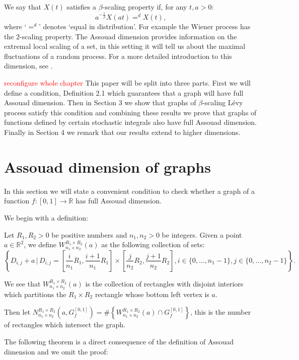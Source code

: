 We say that $X(t)$ satisfies a $\beta$-scaling property if, for any $t,a>0$:
\[
a^{-\frac{1}{\beta}}X(at)=^d X(t),
\]
where `$=^d$' denotes `equal in distribution'.
For example the Wiener process has the $2$-scaling property.
The Assouad dimension provides information on the extremal local scaling of a set, in this setting it will tell us about the maximal fluctuations of a random process. For a more detailed introduction to this dimension, see \cite{Fr, Ro}. 

\textcolor{red}{reconfigure whole chapter} This paper will be split into three parts. First we will define a condition, Definition 2.1 which guarantees that a graph will have full Assouad dimension. Then in Section 3 we show that graphs of $\beta$-scaling L\'evy process satisfy this condition and combining these results we prove that graphs of functions defined by certain stochastic integrals also have full Assouad dimension. Finally in Section 4 we remark that our results extend to higher dimensions.

\section{Assouad dimension of graphs}
In this section we will state a convenient condition to check whether a graph of a function $f:[0,1]\to\mathbb{R}$ has full Assouad dimension.

We begin with a definition:

\begin{definition}\label{Win}
	Let $R_1,R_2>0$ be positive numbers and $n_1,n_2>0$ be integers. Given a point $a\in\mathbb{R}^2$, we define $W_{n_1\times n_2}^{R_1\times R_2}(a)$ as the following collection of sets:
	\[	
	\left\{D_{i,j}+a \, \vert \, D_{i,j}=\left[\frac{i}{n_1}R_1,\frac{i+1}{n_1}R_1\right]\times \left[\frac{j}{n_2}R_2,\frac{j+1}{n_2}R_2\right], i\in\{0,\dots,n_1-1\}, j\in\{0,\dots,n_2-1\}\right\}.
	\]
	
	We see that $W_{n_1\times n_2}^{R_1\times R_2}(a)$ is the collection of rectangles with disjoint interiors which partitions the $R_1\times R_2$ rectangle whose bottom left vertex is $a$.
	
	Then let $N_{n_1\times n_2}^{R_1 \times R_2 }(a,G_f^{[0,1]})= \# \left\{ W_{n_1\times n_2}^{R_1\times R_2}(a) \cap G_f^{[0,1]} \right\}$, this is the number of rectangles which intersect the graph.
\end{definition}

The following theorem is a direct consequence of the definition of Assouad dimension and we omit the proof:


